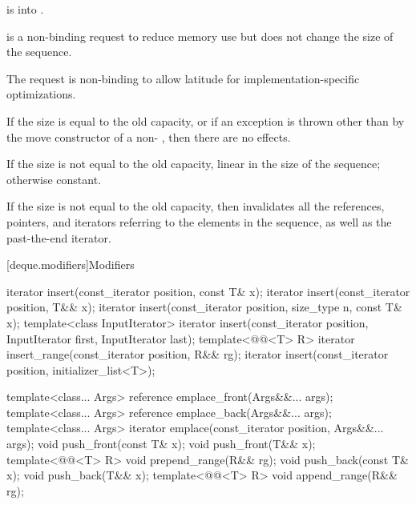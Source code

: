 \begin{itemdescr}
\pnum
\expects
{} is  into .

\pnum
\effects
{} is a non-binding request to reduce memory use
but does not change the size of the sequence.
\begin{note}
The request is non-binding to allow latitude for
implementation-specific optimizations.
\end{note}
If the size is equal to the old capacity, or
if an exception is thrown other than by the move constructor
of a non- ,
then there are no effects.

\pnum
\complexity
If the size is not equal to the old capacity,
linear in the size of the sequence;
otherwise constant.

\pnum
\remarks
If the size is not equal to the old capacity,
then invalidates all the references, pointers, and iterators
referring to the elements in the sequence,
as well as the past-the-end iterator.
\end{itemdescr}

[deque.modifiers]{Modifiers}

%
%
%
%
\begin{itemdecl}
iterator insert(const_iterator position, const T& x);
iterator insert(const_iterator position, T&& x);
iterator insert(const_iterator position, size_type n, const T& x);
template<class InputIterator>
  iterator insert(const_iterator position,
                  InputIterator first, InputIterator last);
template<@@<T> R>
  iterator insert_range(const_iterator position, R&& rg);
iterator insert(const_iterator position, initializer_list<T>);

template<class... Args> reference emplace_front(Args&&... args);
template<class... Args> reference emplace_back(Args&&... args);
template<class... Args> iterator emplace(const_iterator position, Args&&... args);
void push_front(const T& x);
void push_front(T&& x);
template<@@<T> R>
  void prepend_range(R&& rg);
void push_back(const T& x);
void push_back(T&& x);
template<@@<T> R>
  void append_range(R&& rg);
\end{itemdecl}

